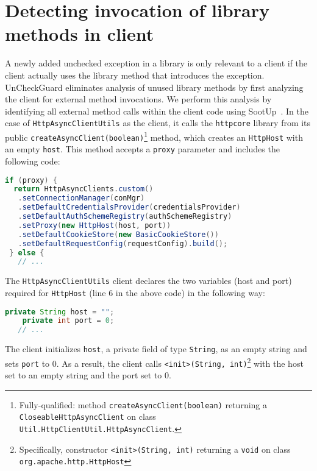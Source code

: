 \section{Detecting invocation of library methods in client}

A newly added unchecked exception in a library is only relevant to a client if the client actually uses the library method that introduces the exception. UnCheckGuard eliminates analysis of unused library methods by first analyzing the client for external method invocations. We perform this analysis by identifying all external method calls within the client code using SootUp~\cite{Karakaya24:_SootUp}. In the case of \texttt{HttpAsyncClientUtils} as the client, it calls the \texttt{httpcore} library from its public \texttt{createAsyncClient(boolean)}\footnote{Fully-qualified: method \texttt{createAsyncClient(boolean)} returning a \texttt{CloseableHttpAsyncClient} on class \texttt{Util.HttpClientUtil.HttpAsyncClient}.} method, which creates an \texttt{HttpHost} with an empty \texttt{host}. This method accepts a \texttt{proxy} parameter and includes the following code:

\begin{lstlisting}[language=Java]
 if (proxy) {
  return HttpAsyncClients.custom()
   .setConnectionManager(conMgr)
   .setDefaultCredentialsProvider(credentialsProvider)
   .setDefaultAuthSchemeRegistry(authSchemeRegistry)
   .setProxy(new HttpHost(host, port))
   .setDefaultCookieStore(new BasicCookieStore())
   .setDefaultRequestConfig(requestConfig).build();
 } else {
   // ...
\end{lstlisting}

The \texttt{HttpAsyncClientUtils} client declares the two variables (host and port) required for \texttt{HttpHost} (line 6 in the above code) in the following way:
\begin{lstlisting}[language=Java]
    private String host = "";
    private int port = 0;
   // ...
\end{lstlisting}

The client initializes \texttt{host}, a private field of type \texttt{String}, as an empty string and sets \texttt{port} to 0. As a result, the client calls \texttt{<init>(String, int)}\footnote{Specifically, constructor \texttt{<init>(String, int)} returning a \texttt{void} on class \texttt{org.apache.http.HttpHost}} with the host set to an empty string and the port set to 0.

